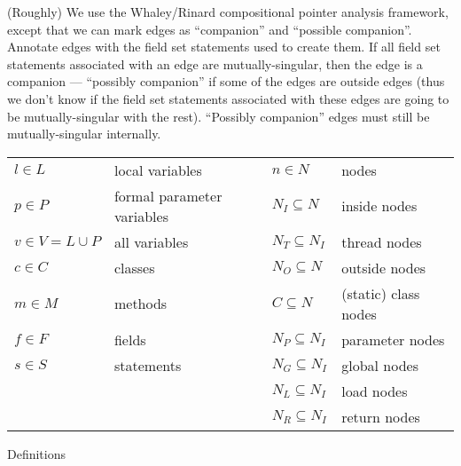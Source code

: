 \documentclass[11pt,notitlepage]{article}
\begin{document}
(Roughly) We use the Whaley/Rinard compositional pointer analysis
framework, except that we can mark edges as ``companion'' and
``possible companion''.  Annotate edges with the field set statements
used to create them.  If all field set statements associated with an
edge are mutually-singular, then the edge is a companion ---
``possibly companion'' if some of the edges are outside edges (thus
we don't know if the field set statements associated with these edges
are going to be mutually-singular with the rest).  ``Possibly
companion'' edges must still be mutually-singular internally.

\begin{myfigure}
\begin{tabular}{ll|ll}
$l\in L$ & local variables           &$n\in N$ & nodes\\
$p\in P$ & formal parameter variables&$N_I\subseteq N$ & inside nodes\\
$v\in V=L\cup P$& all variables      &$N_T\subseteq N_I$ & thread nodes\\
$c\in C$ & classes                   &$N_O\subseteq N$ & outside nodes\\
$m\in M$ & methods                   &$C\subseteq N$ & (static) class nodes\\
$f\in F$ & fields                    &$N_P\subseteq N_I$ & parameter nodes\\
$s\in S$ & statements                &$N_G\subseteq N_I$ & global nodes\\
         &                           &$N_L\subseteq N_I$ & load nodes\\
         &                           &$N_R\subseteq N_I$ & return nodes\\
\end{tabular}
\caption{Definitions}
\label{fig:defin}
\end{myfigure}
\end{document}
